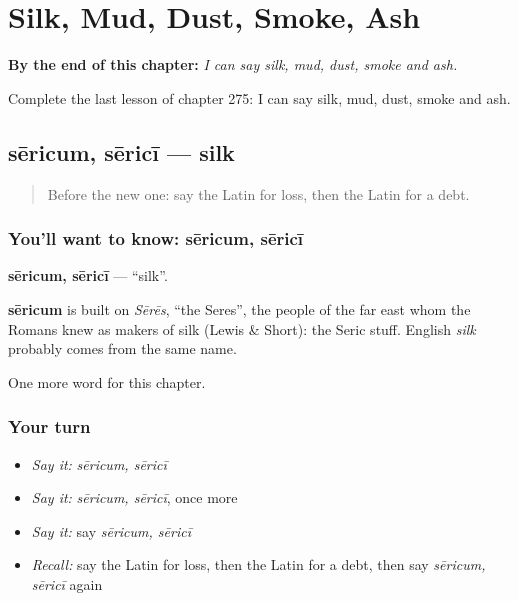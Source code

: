 
\chapter{Silk, Mud, Dust, Smoke, Ash}
\label{ch:la-silk-mud-dust-smoke-ash}

\begin{chapteropening}
\textbf{By the end of this chapter:} \emph{I can say silk, mud, dust, smoke and ash.}

Complete the last lesson of chapter 275: I can say silk, mud, dust, smoke and ash.
\end{chapteropening}

\section[sēricum, sēricī]{sēricum, sēricī — silk}

\label{lesson:LA-C275-sericum}



\begin{quote}
Before the new one: say the Latin for loss, then the Latin for a debt.
\end{quote}

\subsection*{You'll want to know: sēricum, sēricī}
\textbf{sēricum, sēricī} — \textquotedblleft{}silk\textquotedblright{}.

\begin{cousinweb}
\textbf{sēricum} is built on \emph{Sērēs}, \textquotedblleft{}the Seres\textquotedblright{}, the people of the far east whom the Romans knew as makers of silk (Lewis \& Short): the Seric stuff. English \emph{silk} probably comes from the same name.
\end{cousinweb}

\begin{grammarlens}[title={What you've built}]
One more word for this chapter.
\end{grammarlens}

\subsection*{Your turn}
\begin{itemize}
\raggedright
  \item \emph{Say it:} \emph{sēricum, sēricī}
  \item \emph{Say it:} \emph{sēricum, sēricī}, once more
  \item \emph{Say it:} say \emph{sēricum, sēricī}
  \item \emph{Recall:} say the Latin for loss, then the Latin for a debt, then say \emph{sēricum, sēricī} again
\end{itemize}

